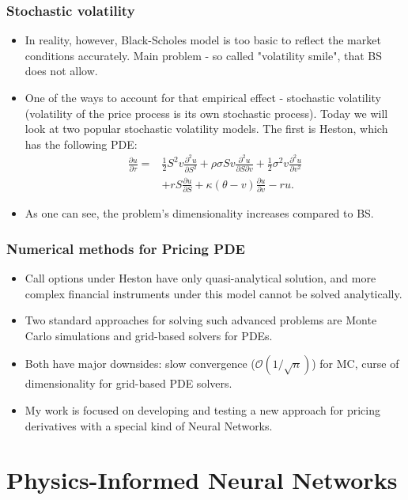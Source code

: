\documentclass{beamer}
\begin{document}
\begin{frame}
\frametitle{Stochastic volatility}
\begin{itemize}
    \item In reality, however, Black-Scholes model is too basic to reflect the market conditions accurately. Main problem - so called "volatility smile", that BS does not allow.
    \item One of the ways to account for that empirical effect - stochastic volatility (volatility of the price process is its own stochastic process). Today we will look at two popular stochastic volatility models. The first is Heston, which has the following PDE:
    \begin{align*}
        \frac{\partial u}{\partial \tau}
= {} & \frac{1}{2} S^{2} v \frac{\partial^{2} u}{\partial S^{2}}
+ \rho \sigma S v \frac{\partial^{2} u}{\partial S \partial v}
+ \frac{1}{2} \sigma^{2} v \frac{\partial^{2} u}{\partial v^{2}} \\
& + r S \frac{\partial u}{\partial S}
+ \kappa (\theta - v) \frac{\partial u}{\partial v}
- r u.
    \end{align*}
    \item As one can see, the problem's dimensionality increases compared to BS.
\end{itemize}
\end{frame}

\begin{frame}
\frametitle{Numerical methods for Pricing PDE}
\begin{itemize}
    \item Call options under Heston have only quasi-analytical solution, and more complex financial instruments under this model cannot be solved analytically.
    \item Two standard approaches for solving such advanced problems are Monte Carlo simulations and grid-based solvers for PDEs.
    \item Both have major downsides: slow convergence ($\mathcal{O}(1/\sqrt{n})$) for MC, curse of dimensionality for grid-based PDE solvers.
    \item My work is focused on developing and testing a new approach for pricing derivatives with a special kind of Neural Networks.
\end{itemize}
\end{frame}

\section{Physics-Informed Neural Networks}
\end{document}

